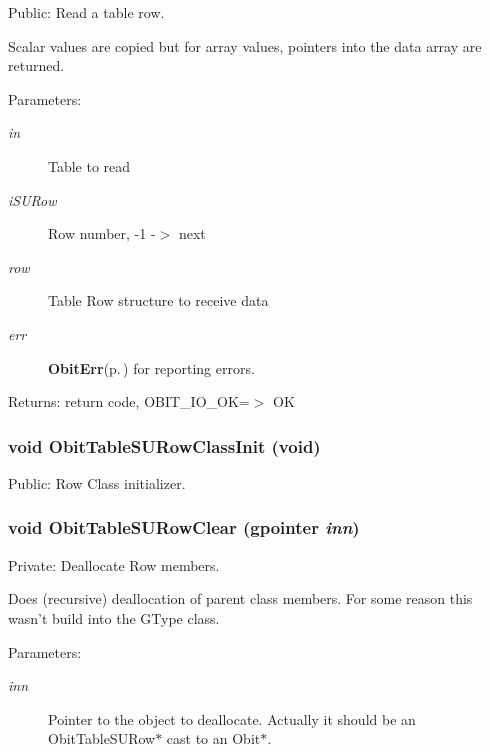 Public: Read a table row. 

Scalar values are copied but for array values, pointers into the data array are returned. \begin{Desc}
\item[Parameters:]
\begin{description}
\item[{\em in}]Table to read \item[{\em i\-SURow}]Row number, -1 -$>$ next \item[{\em row}]Table Row structure to receive data \item[{\em err}]{\bf Obit\-Err}{\rm (p.\,\pageref{structObitErr})} for reporting errors. \end{description}
\end{Desc}
\begin{Desc}
\item[Returns:]return code, OBIT\_\-IO\_\-OK=$>$ OK \end{Desc}
\subsubsection{\setlength{\rightskip}{0pt plus 5cm}void Obit\-Table\-SURow\-Class\-Init (void)}\label{ObitTableSU_8c_a26}


Public: Row Class initializer. 

\subsubsection{\setlength{\rightskip}{0pt plus 5cm}void Obit\-Table\-SURow\-Clear (gpointer {\em inn})}\label{ObitTableSU_8c_a7}


Private: Deallocate Row members. 

Does (recursive) deallocation of parent class members. For some reason this wasn't build into the GType class. \begin{Desc}
\item[Parameters:]
\begin{description}
\item[{\em inn}]Pointer to the object to deallocate. Actually it should be an Obit\-Table\-SURow$\ast$ cast to an Obit$\ast$. \end{description}
\end{Desc}
